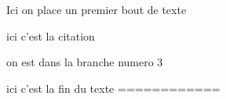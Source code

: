 \documentclass{sn-jnl}%
\begin{document}
Ici on place un premier bout de texte

	ici c'est la citation \cite{armstrong_simple_2011}

on est dans la branche numero 3

ici c'est la fin du texte
============%

\end{document}
